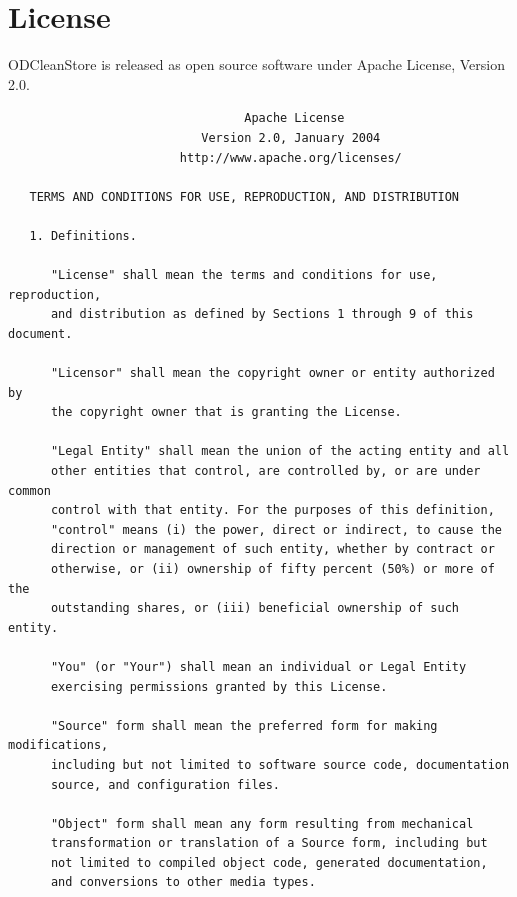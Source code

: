

\appendix

\chapter{License}
ODCleanStore is released as open source software under Apache License, Version 2.0.

\begin{verbatim}
                                 Apache License
                           Version 2.0, January 2004
                        http://www.apache.org/licenses/

   TERMS AND CONDITIONS FOR USE, REPRODUCTION, AND DISTRIBUTION

   1. Definitions.

      "License" shall mean the terms and conditions for use, reproduction,
      and distribution as defined by Sections 1 through 9 of this document.

      "Licensor" shall mean the copyright owner or entity authorized by
      the copyright owner that is granting the License.

      "Legal Entity" shall mean the union of the acting entity and all
      other entities that control, are controlled by, or are under common
      control with that entity. For the purposes of this definition,
      "control" means (i) the power, direct or indirect, to cause the
      direction or management of such entity, whether by contract or
      otherwise, or (ii) ownership of fifty percent (50%) or more of the
      outstanding shares, or (iii) beneficial ownership of such entity.

      "You" (or "Your") shall mean an individual or Legal Entity
      exercising permissions granted by this License.

      "Source" form shall mean the preferred form for making modifications,
      including but not limited to software source code, documentation
      source, and configuration files.

      "Object" form shall mean any form resulting from mechanical
      transformation or translation of a Source form, including but
      not limited to compiled object code, generated documentation,
      and conversions to other media types.


\end{verbatim}

